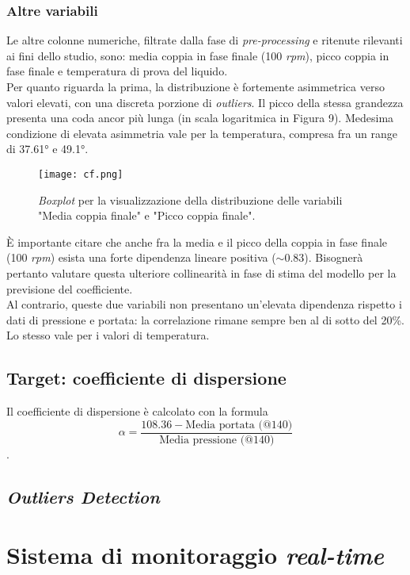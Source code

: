 \documentclass[fleqn,10pt]{SelfArx} %
\begin{document}
\subsubsection{Altre variabili}
Le altre colonne numeriche, filtrate dalla fase di \textit{pre-processing} e ritenute rilevanti ai fini dello studio, sono: media coppia in fase finale (100 \textit{rpm}), picco coppia in fase finale e temperatura di prova del liquido.\\
Per quanto riguarda la prima, la distribuzione è fortemente asimmetrica verso valori elevati, con una discreta porzione di \textit{outliers}. Il picco della stessa grandezza presenta una coda ancor più lunga (in scala logaritmica in Figura 9). Medesima condizione di elevata asimmetria vale per la temperatura, compresa fra un range di 37.61° e 49.1°.
\begin{figure}[h]
    \centering
    \texttt{[image: cf.png]}
    \label{fig:em}
    \caption{\textit{Boxplot} per la visualizzazione della distribuzione delle variabili "Media coppia finale" e "Picco coppia finale".}
\end{figure}
È importante citare che anche fra la media e il picco della coppia in fase finale (100 \textit{rpm}) esista una forte dipendenza lineare positiva ($\sim$0.83). Bisognerà pertanto valutare questa ulteriore collinearità in fase di stima del modello per la previsione del coefficiente.\\
Al contrario, queste due variabili non presentano un'elevata dipendenza rispetto i dati di pressione e portata: la correlazione rimane sempre ben al di sotto del 20\%. Lo stesso vale per i valori di temperatura.

\subsection{Target: coefficiente di dispersione}
Il coefficiente di dispersione è calcolato con la formula
$$\alpha=\frac{108.36-\text{Media portata (@140)}}{\text{Media pressione (@140)}}$$.


\subsection{\textit{Outliers Detection}}
\section{Sistema di monitoraggio \textit{real-time}}
\end{document}
